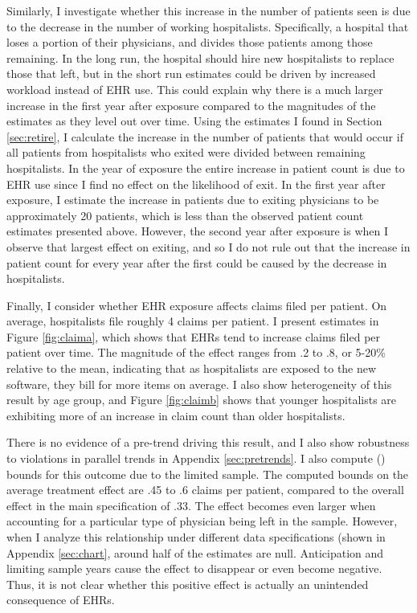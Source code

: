 \documentclass[12pt]{article}
\begin{document}
Similarly, I investigate whether this increase in the number of patients seen is due to the decrease in the number of working hospitalists. Specifically, a hospital that loses a portion of their physicians, and divides those patients among those remaining. In the long run, the hospital should hire new hospitalists to replace those that left, but in the short run estimates could be driven by increased workload instead of EHR use. This could explain why there is a much larger increase in the first year after exposure compared to the magnitudes of the estimates as they level out over time. Using the estimates I found in Section \ref{sec:retire}, I calculate the increase in the number of patients that would occur if all patients from hospitalists who exited were divided between remaining hospitalists. In the year of exposure the entire increase in patient count is due to EHR use since I find no effect on the likelihood of exit. In the first year after exposure, I estimate the increase in patients due to exiting physicians to be approximately 20 patients, which is less than the observed patient count estimates presented above. However, the second year after exposure is when I observe that largest effect on exiting, and so I do not rule out that the increase in patient count for every year after the first could be caused by the decrease in hospitalists. 

Finally, I consider whether EHR exposure affects claims filed per patient. On average, hospitalists file roughly 4 claims per patient. I present estimates in Figure \ref{fig:claima}, which shows that EHRs tend to increase claims filed per patient over time. The magnitude of the effect ranges from .2 to .8, or 5-20\% relative to the mean, indicating that as hospitalists are exposed to the new software, they bill for more items on average.  I also show heterogeneity of this result by age group, and Figure \ref{fig:claimb} shows that younger hospitalists are exhibiting more of an increase in claim count than older hospitalists.

There is no evidence of a pre-trend driving this result, and I also show robustness to violations in parallel trends in Appendix \ref{sec:pretrends}. I also compute \citeauthor{lee2009training} (\citeyear{lee2009training}) bounds for this outcome due to the limited sample. The computed bounds on the average treatment effect are .45 to .6 claims per patient, compared to the overall effect in the main specification of .33. The effect becomes even larger when accounting for a particular type of physician being left in the sample. However, when I analyze this relationship under different data specifications (shown in Appendix \ref{sec:chart}, around half of the estimates are null. Anticipation and limiting sample years cause the effect to disappear or even become negative. Thus, it is not clear whether this positive effect is actually an unintended consequence of EHRs. 
     
\end{document}
